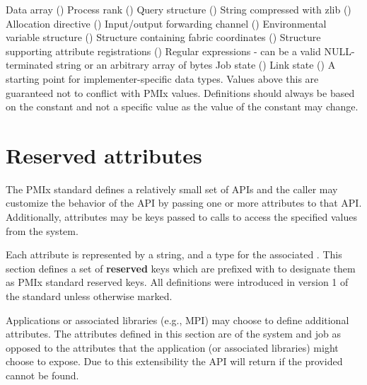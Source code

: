 \begin{constantdesc}
%
Data array ()
%
Process rank ()
%
Query structure ()
%
String compressed with zlib ()
%
Allocation directive ()
%
Input/output forwarding channel ()
%
Environmental variable structure ()
%
Structure containing fabric coordinates ()
%
Structure supporting attribute registrations ()
%
Regular expressions - can be a valid NULL-terminated string or an arbitrary array of bytes
%
Job state ()
%
Link state ()
%
A starting point for implementer-specific data types.
Values above this are guaranteed not to conflict with \ac{PMIx} values.
Definitions should always be based on the  constant and not a specific value as the value of the constant may change.
%

\end{constantdesc}

\section{Reserved attributes}
\label{api:struct:attributes}

The PMIx standard defines a relatively small set of APIs and the caller may customize the behavior of the API by passing one or more attributes to that API.
Additionally, attributes may be keys passed to  calls to access the specified values from the system.

Each attribute is represented by a  string, and a type for the associated .
This section defines a set of \textbf{reserved} keys which are prefixed with  to designate them as PMIx standard reserved keys. All definitions were introduced in version 1 of the standard unless otherwise marked.

Applications or associated libraries (e.g., \ac{MPI}) may choose to define additional attributes.
The attributes defined in this section are of the system and job as opposed to the attributes that the application (or associated libraries) might choose to expose.
Due to this extensibility the  API will return  if the provided  cannot be found.

